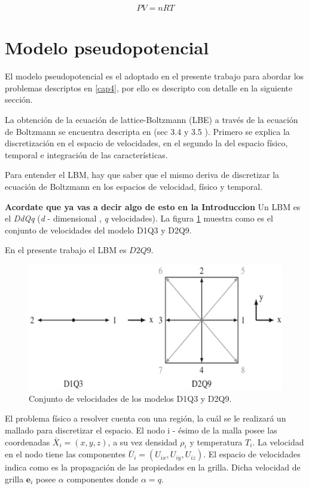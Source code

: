 \begin{align}

    P V = n R T
    \label{eq:gas_ideal}
\end{align}




\section{Modelo pseudopotencial}

El modelo pseudopotencial es el adoptado en el presente trabajo para abordar los problemas descriptos en \ref{cap4}, por ello es descripto con detalle en la siguiente sección.


La obtención de la ecuación de lattice-Boltzmann (LBE) a través de la ecuación de Boltzmann se encuentra descripta en \cite{kruger2017lattice} (sec 3.4 y 3.5 ). Primero se explica la discretización en el espacio de velocidades, en el segundo la del espacio físico, temporal e integración de las características.


Para entender el LBM, hay que saber que el mismo deriva de discretizar la ecuación de Boltzmann en los espacios de velocidad, físico y temporal.  

\textbf{Acordate que ya vas a decir algo de esto en la Introduccion}
Un LBM es el \textit{DdQq} (\textit{d} - dimensional , \textit{q} velocidades). La figura \ref{fig:D1Q3_D2Q9} muestra como es el conjunto de velocidades del modelo D1Q3 y D2Q9.

En el presente trabajo el LBM es $D2Q9$. 

\begin{figure}[h]
	\centering
    \includegraphics[width=.8\textwidth]{figs/cap2/D1Q3_D2Q9}
	\caption{Conjunto de velocidades de los modelos D1Q3 y D2Q9. \cite{kruger2017lattice}}
	\label{fig:D1Q3_D2Q9}	
\end{figure}

El problema físico a resolver cuenta con una región, la cuál se le realizará un mallado para discretizar el espacio. El nodo i - ésimo de la malla posee las coordenadas ${\bar{X}}_{i} = (x,y,z)$, a su vez densidad $\rho_{i}$ y temperatura $T_{i}$. La velocidad en el nodo tiene las componentes ${\bar{U}}_{i} = ({U}_{ix},{U}_{iy},{U}_{iz})$. El espacio de velocidades indica como es la propagación de las propiedades en la grilla. Dicha velocidad de grilla $\mathbf{e}_{i}$ posee $\alpha$ componentes donde $\alpha = q $. 

